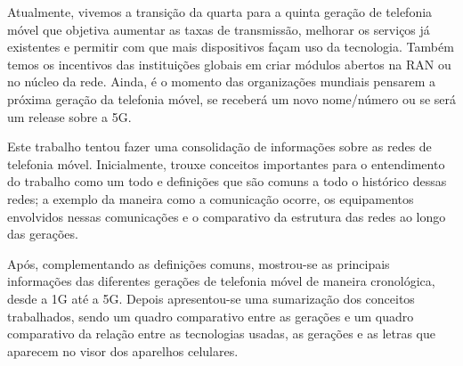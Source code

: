 \documentclass[11pt,oneside,a4paper]{abntex2}
\begin{document}
Atualmente, vivemos a transição da quarta para a quinta geração de telefonia móvel que objetiva aumentar as taxas de transmissão, melhorar os serviços já existentes e permitir com que mais dispositivos façam uso da tecnologia. Também temos os incentivos das instituições globais em criar módulos abertos na RAN ou no núcleo da rede. Ainda, é o momento das organizações mundiais pensarem a próxima geração da telefonia móvel, se receberá um novo nome/número ou se será um release sobre a 5G.

Este trabalho tentou fazer uma consolidação de informações sobre as redes de telefonia móvel. Inicialmente, trouxe conceitos importantes para o entendimento do trabalho como um todo e definições que são comuns a todo o histórico dessas redes; a exemplo da maneira como a comunicação ocorre, os equipamentos envolvidos nessas comunicações e o comparativo da estrutura das redes ao longo das gerações.

Após, complementando as definições comuns, mostrou-se as principais informações das diferentes gerações de telefonia móvel de maneira cronológica, desde a 1G até a 5G. Depois apresentou-se uma sumarização dos conceitos trabalhados, sendo um quadro comparativo entre as gerações e um quadro comparativo da relação entre as tecnologias usadas, as gerações e as letras que aparecem no visor dos aparelhos celulares.


\label{biblio}
\end{document}
